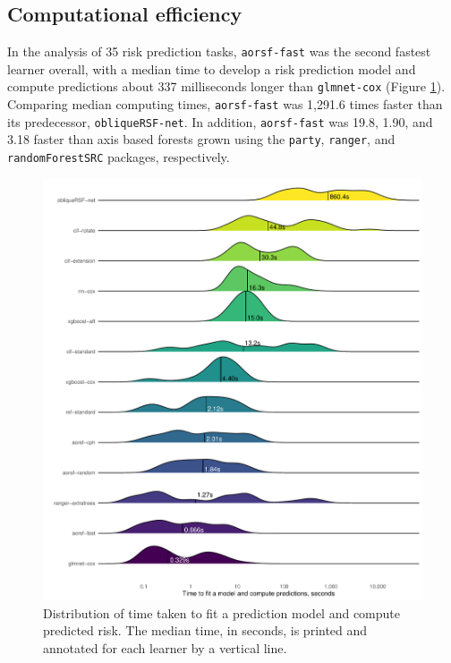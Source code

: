 \documentclass[12pt]{article}\usepackage[]{graphicx}\usepackage[]{xcolor}
\makeatletter
\def\maxwidth{ %
  \ifdim\Gin@nat@width>\linewidth
    \linewidth
  \else
    \Gin@nat@width
  \fi
}
\newenvironment{knitrout}{}{} %
\makeatother
\begin{document}
\subsection{Computational efficiency} \label{sec:results_computing}




In the analysis of 35 risk prediction tasks, \texttt{aorsf-fast} was the second fastest learner overall, with a median time to develop a risk prediction model and compute predictions about 337 milliseconds longer than \texttt{glmnet-cox} (Figure \ref{fig:bm_pred_time}). Comparing median computing times, \texttt{aorsf-fast} was 1,291.6 times faster than its predecessor, \texttt{obliqueRSF-net}. In addition, \texttt{aorsf-fast} was 19.8, 1.90, and 3.18 faster than axis based forests grown using the \texttt{party}, \texttt{ranger}, and \texttt{randomForestSRC} packages, respectively.

\begin{knitrout}
\color{fgcolor}\begin{figure}
\includegraphics[width=\maxwidth]{figure/bm_pred_time-1} \caption[Distribution of time taken to fit a prediction model and compute predicted risk]{Distribution of time taken to fit a prediction model and compute predicted risk. The median time, in seconds, is printed and annotated for each learner by a vertical line.}\label{fig:bm_pred_time}
\end{figure}

\end{knitrout}
\end{document}
